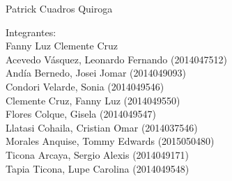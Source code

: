 \documentclass[12pt,letterpaper]{article}
\begin{document}
\begin{titlepage}
\begin{center}
\vspace*{0.1in}
\begin{large}
 Patrick Cuadros Quiroga\\
\end{large}

\vspace*{0.2in}
\vspace*{0.1in}
\begin{large}
\begin{flushleft}
Integrantes: \\
Fanny Luz Clemente Cruz \\
Acevedo Vásquez, Leonardo Fernando 	(2014047512) \\
Andía Bernedo, Josei Jomar 			(2014049093) \\
Condori Velarde, Sonia          	(2014049546) \\
Clemente Cruz, Fanny Luz    		(2014049550) \\
Flores Colque, Gisela           	(2014049547) \\
Llatasi Cohaila, Cristian Omar		(2014037546) \\
Morales Anquise, Tommy Edwards 		(2015050480) \\
Ticona Arcaya, Sergio Alexis		(2014049171) \\
Tapia Ticona, Lupe Carolina			(2014049548) \\
\end{flushleft}


\end{large}
\end{center}

\end{titlepage}




 \tableofcontents
 \newpage

 
\end{document}
